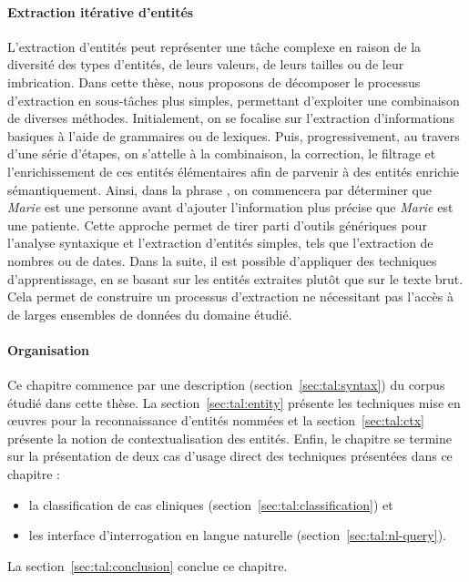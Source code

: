 \paragraph{Extraction itérative d'entités}
L'extraction d'entités peut représenter une tâche complexe en raison de la diversité des types d'entités, de leurs valeurs, de leurs tailles ou de leur imbrication.
Dans cette thèse, nous proposons de décomposer le processus d'extraction en sous-tâches plus simples, permettant d'exploiter une combinaison de diverses méthodes.
Initialement, on se focalise sur l'extraction d'informations basiques à l'aide de grammaires ou de lexiques.
Puis, progressivement, au travers d'une série d'étapes, on s'attelle à la combinaison, la correction, le filtrage et l'enrichissement de ces entités élémentaires afin de parvenir à des entités enrichie sémantiquement.
Ainsi, dans la phrase , on commencera par déterminer que \emph{Marie} est une personne avant d'ajouter l'information plus précise que \emph{Marie} est une patiente.
Cette approche permet de tirer parti d'outils génériques pour l'analyse syntaxique et l'extraction d'entités simples, tels que l'extraction de nombres ou de dates.
Dans la suite, il est possible d'appliquer des techniques d'apprentissage, en se basant sur les entités extraites plutôt que sur le texte brut.
Cela permet de construire un processus d'extraction ne nécessitant pas l'accès à de larges ensembles de données du domaine étudié.

\paragraph{Organisation}
Ce chapitre commence par une description (section~\ref{sec:tal:syntax}) du corpus étudié dans cette thèse.
La section~\ref{sec:tal:entity} présente les techniques mise en œuvres pour la reconnaissance d'entités nommées et la section~\ref{sec:tal:ctx} présente la notion de contextualisation des entités.
Enfin, le chapitre se termine sur la présentation de deux cas d'usage direct des techniques présentées dans ce chapitre :
\begin{itemize}
    \item la classification de cas cliniques (section~\ref{sec:tal:classification}) et
    \item les interface d'interrogation en langue naturelle (section~\ref{sec:tal:nl-query}).
\end{itemize}
La section~\ref{sec:tal:conclusion} conclue ce chapitre.

